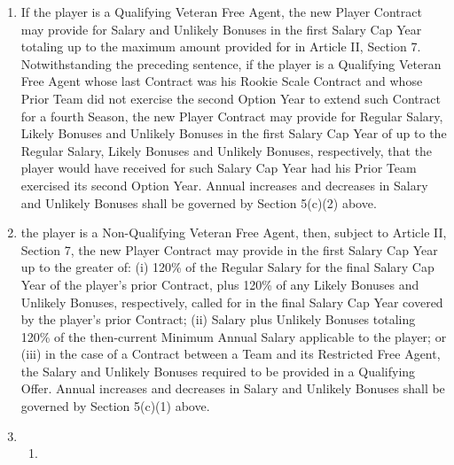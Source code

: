 \documentclass[
]{book}
\providecommand{\tightlist}{%
  \setlength{\itemsep}{0pt}\setlength{\parskip}{0pt}}
\begin{document}
\begin{enumerate}
\def\labelenumi{(\arabic{enumi})}
\item
  If the player is a Qualifying Veteran Free Agent, the new Player Contract may provide for Salary and Unlikely Bonuses in the first Salary Cap Year totaling up to the maximum amount provided for in Article II, Section 7. Notwithstanding the preceding sentence, if the player is a Qualifying Veteran Free Agent whose last Contract was his Rookie Scale Contract and whose Prior Team did not exercise the second Option Year to extend such Contract for a fourth Season, the new Player Contract may provide for Regular Salary, Likely Bonuses and Unlikely Bonuses in the first Salary Cap Year of up to the Regular Salary, Likely Bonuses and Unlikely Bonuses, respectively, that the player would have received for such Salary Cap Year had his Prior Team exercised its second Option Year. Annual increases and decreases in Salary and Unlikely Bonuses shall be governed by Section 5(c)(2) above.
\item
  the player is a Non-Qualifying Veteran Free Agent, then, subject to Article II, Section 7, the new Player Contract may provide in the first Salary Cap Year up to the greater of: (i) 120\% of the Regular Salary for the final Salary Cap Year of the player's prior Contract, plus 120\% of any Likely Bonuses and Unlikely Bonuses, respectively, called for in the final Salary Cap Year covered by the player's prior Contract; (ii) Salary plus Unlikely Bonuses totaling 120\% of the then-current Minimum Annual Salary applicable to the player; or (iii) in the case of a Contract between a Team and its Restricted Free Agent, the Salary and Unlikely Bonuses required to be provided in a Qualifying Offer. Annual increases and decreases in Salary and Unlikely Bonuses shall be governed by Section 5(c)(1) above.
\item
  \begin{enumerate}
  \def\labelenumii{(\roman{enumii})}
  \tightlist
  \item

\end{enumerate}
\end{enumerate}
\end{document}
